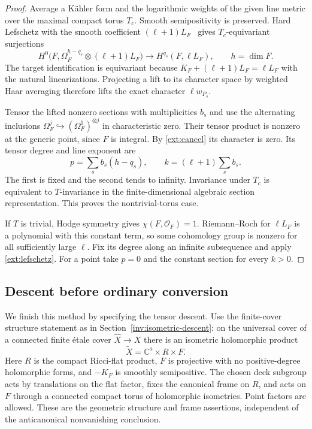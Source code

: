 \begin{proof}
Average a K\"ahler form and the logarithmic weights of the given
line metric over the maximal compact torus $T_c$.  Smooth
semipositivity is preserved.  Hard Lefschetz with the smooth
coefficient $(\ell+1)L_F$~\cite[Theorem~0.1]{DPS2001} gives
$T_c$-equivariant surjections
\begin{equation}\label{ext:lefschetz}
 H^0\bigl(F,\Omega_F^{h-q_s}\otimes(\ell+1)L_F\bigr)
 \longrightarrow H^{q_s}(F,\ell L_F),\qquad h=\dim F.
\end{equation}
The target identification is equivariant because
$K_F+(\ell+1)L_F=\ell L_F$ with the natural linearizations.
Projecting a lift to its character space by weighted Haar averaging
therefore lifts the exact character $\ell w_{P_s}$.

Tensor the lifted nonzero sections with multiplicities $b_s$ and
use the alternating inclusions
$\Omega_F^j\hookrightarrow(\Omega_F^1)^{\otimes j}$ in
characteristic zero.  Their tensor product is nonzero at the generic
point, since $F$ is integral.  By \eqref{ext:cancel} its character
is zero.  Its tensor degree and line exponent are
\[
 p=\sum_s b_s(h-q_s),\qquad
 k=(\ell+1)\sum_s b_s.
\]
The first is fixed and the second tends to infinity.  Invariance
under $T_c$ is equivalent to $T$-invariance in the finite-dimensional
algebraic section representation.  This proves the nontrivial-torus
case.

If $T$ is trivial, Hodge symmetry gives
$\chi(F,\mathcal O_F)=1$.  Riemann--Roch for $\ell L_F$ is a
polynomial with this constant term, so some cohomology group is
nonzero for all sufficiently large $\ell$.  Fix its degree along
an infinite subsequence and apply \eqref{ext:lefschetz}.
For a point take $p=0$ and the constant section for every $k>0$.
\end{proof}

\subsection{Descent before ordinary conversion}

We finish this method by specifying the tensor descent.  Use the
finite-cover structure statement as in
Section~\ref{inv:isometric-descent}: on the universal cover of a
connected finite \'etale cover $\widehat X\to X$ there is an
isometric holomorphic product
\[
 \widetilde X=\mathbb C^a\times R\times F.
\]
Here $R$ is the compact Ricci-flat product, $F$ is projective with
no positive-degree holomorphic forms, and $-K_F$ is smoothly
semipositive.  The chosen deck subgroup acts by translations on
the flat factor, fixes the canonical frame on $R$, and acts on
$F$ through a connected compact torus of holomorphic isometries.
Point factors are allowed.  These are the geometric structure and
frame assertions, independent of the anticanonical nonvanishing
conclusion.

